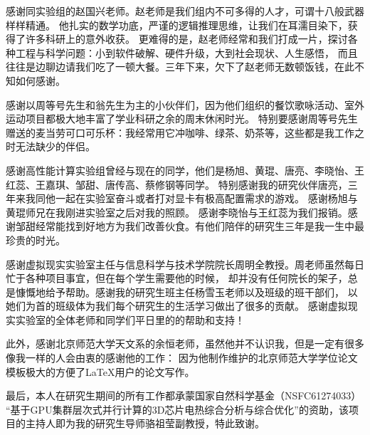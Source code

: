 \begin{ack}
感谢同实验组的赵国兴老师。赵老师是我们组内不可多得的人才，可谓十八般武器样样精通。 他扎实的数学功底，严谨的逻辑推理思维，让我们在耳濡目染下，获得了许多科研上的意外收获。 更难得的是，赵老师经常和我们打成一片，探讨各种工程与科学问题：小到软件破解、硬件升级，大到社会现状、人生感悟， 而且往往是边聊边请我们吃了一顿大餐。三年下来，欠下了赵老师无数顿饭钱，在此不知如何感谢。

感谢以周等号先生和翁先生为主的小伙伴们，因为他们组织的餐饮歌咏活动、室外运动项目都极大地丰富了学业科研之余的周末休闲时光。 特别要感谢周等号先生赠送的麦当劳可口可乐杯：我经常用它冲咖啡、绿茶、奶茶等，这些都是我工作之时无法缺少的伴侣。

感谢高性能计算实验组曾经与现在的同学，他们是杨旭、黄琨、唐亮、李晓怡、王红蕊、王嘉琪、邹甜、唐传高、蔡修钢等同学。 特别感谢我的研究伙伴唐亮，三年来我同他一起在实验室奋斗或者打对显卡有极高配置需求的游戏。 感谢杨旭与黄琨师兄在我刚进实验室之后对我的照顾。 感谢李晓怡与王红蕊为我们报销。感谢邹甜经常能找到好地方为我们改善伙食。有他们陪伴的研究生三年是我一生中最珍贵的时光。

感谢虚拟现实实验室主任与信息科学与技术学院院长周明全教授。周老师虽然每日忙于各种项目事宜，但在每个学生需要他的时候， 却并没有任何院长的架子，总是慷慨地给予帮助。感谢我的研究生班主任杨雪玉老师以及班级的班干部们， 以她们为首的班级体为我们每个研究生的生活学习做出了很多的贡献。 感谢虚拟现实实验室的全体老师和同学们平日里的的帮助和支持！

此外，感谢北京师范大学天文系的余恒老师，虽然他并不认识我，但是一定有很多像我一样的人会由衷的感谢他的工作： 因为他制作维护的北京师范大学学位论文模板极大的方便了\LaTeX{}用户的论文写作。

最后，本人在研究生期间的所有工作都承蒙国家自然科学基金（NSFC61274033） “基于GPU集群层次式并行计算的3D芯片电热综合分析与综合优化”的资助，该项目的主持人即为我的研究生导师骆祖莹副教授，特此致谢。
\end{ack}
